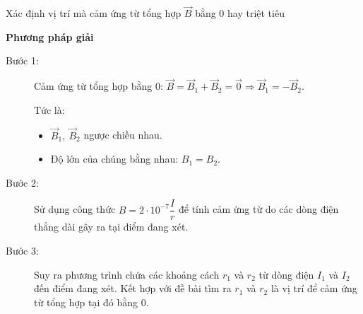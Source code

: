 \begin{dang}{Xác định vị trí mà cảm ứng từ tổng hợp $\vec{B}$ bằng 0 hay triệt tiêu}
\end{dang}

\textbf{Phương pháp giải}
\begin{description}
		\item[Bước 1:] Cảm ứng từ tổng hợp bằng 0: $\vec{B}=\vec{B}_1+\vec{B}_2=\vec{0}\Rightarrow \vec{B}_1=-\vec{B}_2 $.
	
	Tức là:
	
		\begin{itemize}
		\item $\vec{B}_1, \ \vec{B}_2$  ngược chiều nhau. 
		\item Độ lớn của chúng bằng nhau: $B_1=B_2$.
		\end{itemize}
	
	\item[Bước 2:] Sử dụng công thức $B=2\cdot 10^{-7}\dfrac{I}{r}$ để tính cảm ứng từ do các dòng điện thẳng dài gây ra tại điểm đang xét.
	
	\item[Bước 3:] Suy ra phương trình chứa các khoảng cách $r_1$ và $r_2$ từ dòng điện $I_1$ và $I_2$ đến điểm đang xét. Kết hợp với đề bài tìm ra $r_1$ và $r_2$ là vị trí để cảm ứng từ tổng hợp tại đó bằng 0.
	
	
\end{description}

